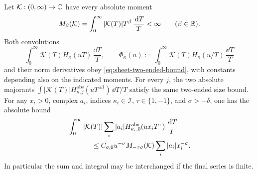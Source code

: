 \begin{lemma}
Let \(\mathcal K:(0,\infty)\to\mathbb{C}\) have every absolute
moment
\[
 M_\beta(\mathcal K)=\int_0^\infty|\mathcal K(T)|T^\beta
                          \,\frac{\,\mathrm{d} T}{T}<\infty
 \qquad(\beta\in\mathbb{R}).
\]
Both convolutions
\[
 \int_0^\infty\mathcal K(T)H_\kappa(uT)\,\frac{\dd T}{T},
 \qquad
 \Phi_\kappa(u):=\int_0^\infty\mathcal K(T)H_\kappa(u/T)
                                      \,\frac{\dd T}{T}
\]
and their norm derivatives obey \eqref{eq:sheet-two-ended-bound},
with constants depending also on the indicated moments.  For every
\(j\), the two absolute majorants
\(\int|\mathcal K(T)|H^{\mathrm{abs}}_{\kappa,j}(uT^{\pm1})\,\dd T/T\)
satisfy the same two-ended size bound.
For any \(x_i>0\), complex \(a_i\), indices
\(\kappa_i\in\mathcal I\), \(\tau\in\{1,-1\}\), and
\(\sigma>-\delta\), one has the absolute bound
\begin{equation}\label{eq:sheet-absolute-sum}
\begin{split}
 &\int_0^\infty|\mathcal K(T)|
       \sum_i|a_i|H^{\mathrm{abs}}_{\kappa_i,0}(u x_iT^\tau)
                                     \,\frac{\dd T}{T}\\
 &\hspace{12mm}\le
 C_{\sigma,0}u^{-\sigma}M_{-\tau\sigma}(\mathcal K)
       \sum_i|a_i|x_i^{-\sigma}.
\end{split}
\end{equation}
In particular the sum and integral may be interchanged if the final
series is finite.
\end{lemma}

